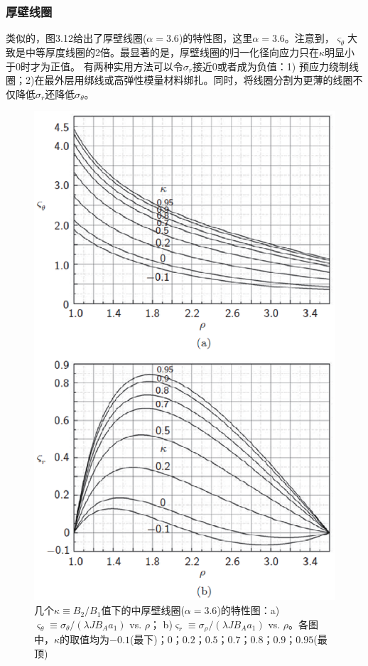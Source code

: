 \subsubsection{厚壁线圈}
类似的，图3.12给出了厚壁线圈($\alpha=3.6$)的特性图，这里$\alpha=3.6$。注意到，$\varsigma_\theta$大致是中等厚度线圈的2倍。最显著的是，厚壁线圈的归一化径向应力只在$\kappa$明显小于0时才为正值。
有两种实用方法可以令$\sigma_{r}$接近0或者成为负值：1) 预应力绕制线圈；2)在最外层用绑线或高弹性模量材料绑扎。同时，将线圈分割为更薄的线圈不仅降低$\sigma_{r}$还降低$\sigma_{\theta}$。
\begin{figure}
  \centering
 \includegraphics[scale=0.7]{chpt3/figs/fig3.12.eps}
  \caption{几个$\kappa\equiv B_2/B_1$值下的中厚壁线圈($\alpha=3.6$)的特性图：a)$\varsigma_\theta\equiv \sigma_\theta/(\lambda J B_A a_1)$ vs. $\rho$；
  b)$\varsigma_r \equiv \sigma_\rho/(\lambda J B_A a_1)$ vs. $\rho$。各图中，$\kappa$的取值均为$-0.1$(最下)；$0$；$0.2$；$0.5$；$0.7$；$0.8$；$0.9$；$0.95$(最顶) }
\end{figure}


